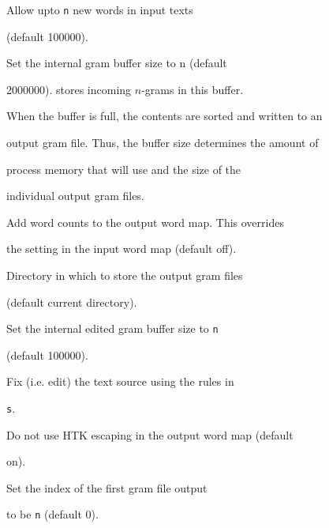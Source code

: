 \begin{optlist}


   Allow upto \texttt{n} new words in input texts


  (default 100000).





   Set the internal gram buffer size to n (default


  2000000).  stores incoming $n$-grams in this buffer.


  When the buffer is full, the contents are sorted and written to an


  output gram file.  Thus, the buffer size determines the amount of


  process memory that  will use and the size of the


  individual output gram files.





   Add word counts to the output word map.  This overrides


       the setting in the input word map (default off).





   Directory in which to store the output gram files


             (default current directory).


        


   Set the internal edited gram buffer size to \texttt{n}


  (default 100000).





   Fix (i.e. edit) the text source using the rules in


	\texttt{s}.





   Do not use HTK escaping in the output word map (default


              on).





   Set the index of the first gram file output 


             to be \texttt{n} (default 0).






\end{optlist}

